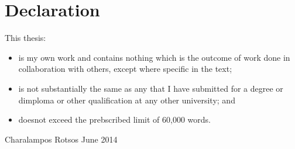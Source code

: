 \chapter*{Declaration}

This thesis:
\begin{itemize}
    \item is my own work and contains nothing which is the outcome of work done
        in collaboration with others, except where specific in the text; 

    \item is not substantially the same as any that I have submitted for a
        degree or dimploma or other qualification at any other university; and 
   
    \item doesnot exceed the prebscribed limit of 60,000 words.
\end{itemize}

{\raggedleft{}Charalampos Rotsos}
{\raggedleft{}June 2014}

